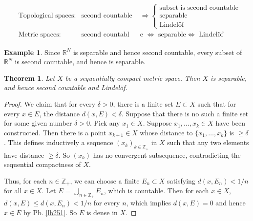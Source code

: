 \documentclass[12pt,b5paper,notitlepage]{article}
\theoremstyle{definition}
\newtheorem{eg}[df]{Example}
\theoremstyle{plain}
\newtheorem{thm}[df]{Theorem}
\newcommand{\ovl}{\overline}
\newcommand{\Zbb}{\mathbb Z}
\newcommand{\Rbb}{\mathbb R}
\numberwithin{equation}{section}
\begin{document}
\begin{align}
\begin{aligned}
&\text{Topological spaces:} &  \text{second countable }&\Longrightarrow \left\{
{\begin{array}{l}
\text{subset is second countable}\\
\text{separable}\\
\text{Lindel\"of}
\end{array}}
\right.\\[0.5ex]
&\text{Metric spaces:}  & \text{second countabl}&\text{e }\Longleftrightarrow\text{ separable}\Longleftrightarrow \text{ Lindel\"of} 
\end{aligned}
\end{align}

\begin{eg}
Since $\Rbb^N$ is separable and hence second countable, every subset of $\Rbb^N$ is second countable, and hence is separable.
\end{eg}



\begin{thm}\label{lb252}
Let $X$ be a sequentially compact metric space. Then $X$ is separable, and hence second countable and Lindel\"of.
\end{thm}

\begin{proof}
We claim that for every $\delta>0$, there is a finite set $E\subset X$ such that for every $x\in E$, the distance $d(x,E)<\delta$. Suppose that there is no such a finite set for some given number $\delta>0$. Pick any $x_1\in X$. Suppose $x_1,\dots,x_k\in X$ have been constructed. Then there is a point $x_{k+1}\in X$ whose distance to $\{x_1,\dots,x_k\}$ is $\geq \delta$. This defines inductively a sequence $(x_k)_{k\in\Zbb_+}$ in $X$ such that any two elements have distance $\geq \delta$. So $(x_k)$ has no convergent subsequence, contradicting the sequential compactness of $X$.

Thus, for each $n\in\Zbb_+$, we can choose a finite  $E_n\subset X$ satisfying  $d(x,E_n)<1/n$ for all $x\in X$. Let $E=\bigcup_{n\in\Zbb_+}E_n$, which is countable. Then for each $x\in X$, $d(x,E)\leq d(x,E_n)<1/n$ for every $n$, which implies $d(x,E)=0$ and hence $x\in\ovl E$ by Pb. \ref{lb251}. So $E$ is dense in $X$.
\end{proof}
\end{document}
